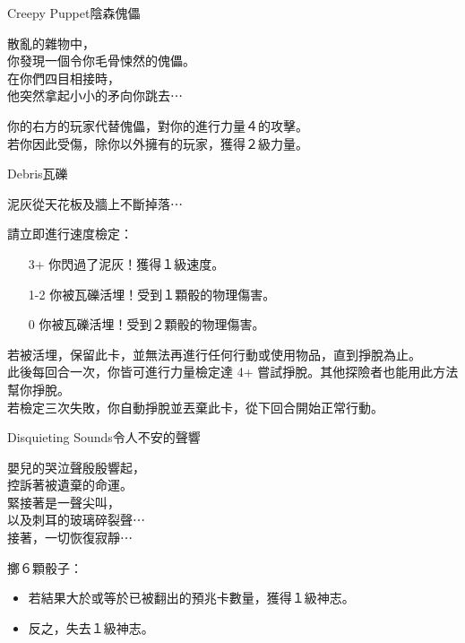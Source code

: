 %
\begin{EventCard}{Creepy Puppet}{陰森傀儡}

  \begin{CardStory}
    散亂的雜物中，\\
    你發現一個令你毛骨悚然的傀儡。\\
    在你們四目相接時，\\
    他突然拿起小小的矛向你跳去⋯
  \end{CardStory}

  你的右方的玩家代替傀儡，對你的進行力量４的攻擊。\\[0.5em]
  若你因此受傷，除你以外擁有的玩家，獲得２級力量。\\[0.5em]

\end{EventCard}%
%
\begin{EventCard}{Debris}{瓦礫}

  \begin{CardStory}
    泥灰從天花板及牆上不斷掉落⋯
  \end{CardStory}

  請立即進行速度檢定：
  \begin{itemize}
    \item[3+] 你閃過了泥灰！獲得１級速度。
    \item[1-2] 你被瓦礫活埋！受到１顆骰的物理傷害。
    \item[0] 你被瓦礫活埋！受到２顆骰的物理傷害。
  \end{itemize}
  若被活埋，保留此卡，並無法再進行任何行動或使用物品，直到掙脫為止。\\[0.5em]
  此後每回合一次，你皆可進行力量檢定達 4+ 嘗試掙脫。其他探險者也能用此方法幫你掙脫。\\[0.5em]
  若檢定三次失敗，你自動掙脫並丟棄此卡，從下回合開始正常行動。\\[0.5em]

\end{EventCard}%
%
\begin{EventCard}{Disquieting Sounds}{令人不安的聲響}

  \begin{CardStory}
    嬰兒的哭泣聲殷殷響起，\\
    控訴著被遺棄的命運。\\
    緊接著是一聲尖叫，\\
    以及刺耳的玻璃碎裂聲⋯\\
    接著，一切恢復寂靜⋯
  \end{CardStory}

  擲６顆骰子：
  \begin{itemize}
    \item 若結果大於或等於已被翻出的預兆卡數量，獲得１級神志。
    \item 反之，失去１級神志。
  \end{itemize}

\end{EventCard}%
